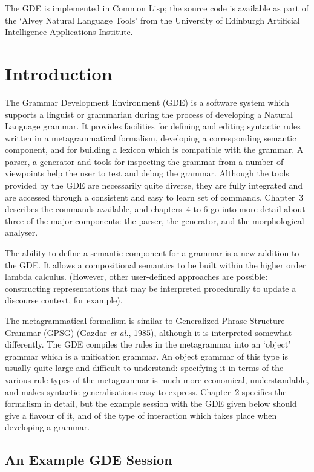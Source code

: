 The GDE is implemented in Common Lisp; the source code is
available as part of the `Alvey Natural Language Tools' from the
University of Edinburgh Artificial Intelligence Applications Institute.

\tableofcontents


\chapter{Introduction}

The Grammar Development Environment (GDE) is a software system which
supports a linguist or grammarian during the process of developing a
Natural Language grammar. It provides facilities for defining and
editing syntactic rules written in a metagrammatical formalism,
developing a corresponding semantic component, and for building a
lexicon which is compatible with the grammar. A parser, a generator and
tools for inspecting the grammar from a number of viewpoints help the
user to test and debug the grammar. Although the tools provided by the
GDE are necessarily quite diverse, they are fully integrated and are
accessed through a consistent and easy to learn set of commands.
Chapter~3 describes the commands available, and chapters~4 to 6 go into
more detail about three of the major components: the parser, the
generator, and the morphological analyser.

The ability to define a semantic component for a grammar is a new
addition to the GDE. It allows a compositional semantics to be built
within the higher order lambda calculus. (However, other user-defined
approaches are possible: constructing representations that may be
interpreted procedurally to update a discourse context, for example).

The metagrammatical formalism is similar to Generalized Phrase Structure
Grammar (GPSG) (Gazdar {\it et al.}, 1985), although it is interpreted
somewhat differently.  The GDE compiles the rules in the metagrammar
into an `object' grammar which is a unification grammar. An object
grammar of this type is usually quite large and difficult to understand:
specifying it in terms of the various rule types of the metagrammar is
much more economical, understandable, and makes syntactic
generalisations easy to express.  Chapter~2 specifies the formalism in
detail, but the example session with the GDE given below should give a
flavour of it, and of the type of interaction which takes place when
developing a grammar.

\section{An Example GDE Session}

